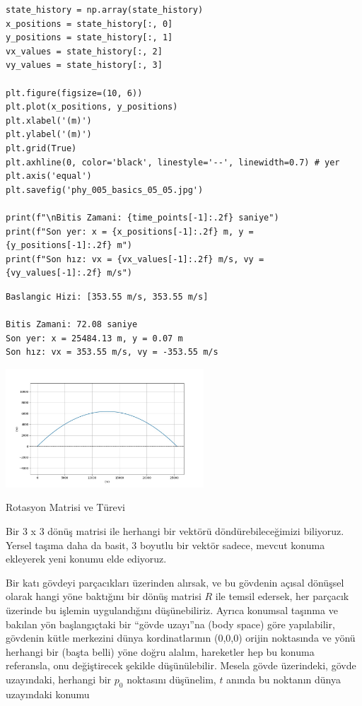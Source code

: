 \documentclass[12pt,fleqn]{article}\usepackage{../../common}
\begin{document}
\begin{verbatim}
state_history = np.array(state_history)
x_positions = state_history[:, 0]
y_positions = state_history[:, 1]
vx_values = state_history[:, 2]
vy_values = state_history[:, 3]

plt.figure(figsize=(10, 6))
plt.plot(x_positions, y_positions)
plt.xlabel('(m)')
plt.ylabel('(m)')
plt.grid(True)
plt.axhline(0, color='black', linestyle='--', linewidth=0.7) # yer
plt.axis('equal') 
plt.savefig('phy_005_basics_05_05.jpg')

print(f"\nBitis Zamani: {time_points[-1]:.2f} saniye")
print(f"Son yer: x = {x_positions[-1]:.2f} m, y = {y_positions[-1]:.2f} m")
print(f"Son hız: vx = {vx_values[-1]:.2f} m/s, vy = {vy_values[-1]:.2f} m/s")
\end{verbatim}

\begin{verbatim}
Baslangic Hizi: [353.55 m/s, 353.55 m/s]

Bitis Zamani: 72.08 saniye
Son yer: x = 25484.13 m, y = 0.07 m
Son hız: vx = 353.55 m/s, vy = -353.55 m/s
\end{verbatim}

\includegraphics[width=20em]{phy_005_basics_05_05.jpg}


Rotasyon Matrisi ve Türevi

Bir 3 x 3 dönüş matrisi ile herhangi bir vektörü döndürebileceğimizi biliyoruz.
Yersel taşıma daha da basit, 3 boyutlu bir vektör sadece, mevcut konuma
ekleyerek yeni konumu elde ediyoruz.

Bir katı gövdeyi parçacıkları üzerinden alırsak, ve bu gövdenin açısal dönüşsel
olarak hangi yöne baktığını bir dönüş matrisi $R$ ile temsil edersek, her
parçacık üzerinde bu işlemin uygulandığını düşünebiliriz. Ayrıca konumsal
taşınma ve bakılan yön başlangıçtaki bir ``gövde uzayı''na (body space) göre
yapılabilir, gövdenin kütle merkezini dünya kordinatlarının (0,0,0) orijin
noktasında ve yönü herhangi bir (başta belli) yöne doğru alalım, hareketler hep
bu konuma referansla, onu değiştirecek şekilde düşünülebilir.  Mesela gövde
üzerindeki, gövde uzayındaki, herhangi bir $p_0$ noktasını düşünelim, $t$ anında
bu noktanın dünya uzayındaki konumu
\end{document}
